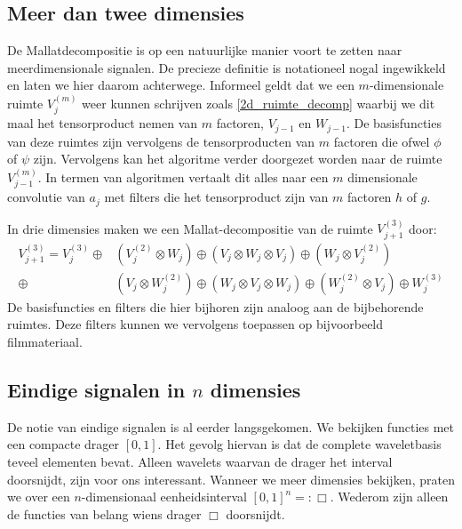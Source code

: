\subsection{Meer dan twee dimensies}
\label{mallat_md}
De Mallatdecompositie is op een natuurlijke manier voort te zetten naar meerdimensionale signalen.
De precieze definitie is notationeel nogal ingewikkeld en laten we hier daarom achterwege.
Informeel geldt dat we een $m$-dimensionale ruimte $V_{j}^{(m)}$ 
weer kunnen schrijven zoals \eqref{2d_ruimte_decomp}
waarbij we dit maal het tensorproduct nemen van $m$ factoren, $V_{j-1}$ en $W_{j-1}$.
De basisfuncties van deze ruimtes zijn vervolgens de tensorproducten van $m$ 
factoren die ofwel $\phi$ of $\psi$ zijn.
Vervolgens kan het algoritme verder doorgezet worden naar de ruimte $V_{j-1}^{(m)}$.
In termen van algoritmen vertaalt dit alles naar een $m$ dimensionale convolutie van $a_j$ met 
filters die het tensorproduct zijn van $m$ factoren $h$ of $g$.
\begin{voorbeeld}
  In drie dimensies maken we een Mallat-decompositie van de ruimte $V_{j+1}^{(3)}$ door:
  \[
  \begin{split}
    V_{j+1}^{(3)} = V_{j}^{(3)} \oplus& \left (V_j^{(2)} \otimes W_j \right) 
                              \oplus \left (V_j\otimes W_j \otimes V_j \right) 
                              \oplus \left (W_j\otimes V_j^{(2)} \right)\\ 
                              \oplus& \left (V_j\otimes W_j^{(2)} \right)  
                              \oplus \left (W_j\otimes V_j \otimes W_j \right) 
                              \oplus \left (W_j^{(2)} \otimes V_j \right) 
                              \oplus W_j^{(3)}
  \end{split}
  \]
  De basisfuncties en filters die hier bijhoren zijn analoog aan de bijbehorende ruimtes.
  Deze filters kunnen we vervolgens toepassen op bijvoorbeeld filmmateriaal.
\end{voorbeeld}

\subsection{Eindige signalen in $n$ dimensies}
De notie van eindige signalen is al eerder langsgekomen. We bekijken functies met een compacte drager $[0,1]$. 
Het gevolg hiervan is dat de complete waveletbasis teveel elementen bevat. 
Alleen wavelets waarvan de drager het interval doorsnijdt, zijn voor ons interessant. 
Wanneer we meer dimensies bekijken, praten we over een $n$-dimensionaal eenheidsinterval $[0,1]^n =: \Box$. 
Wederom zijn alleen de functies van belang wiens drager $\Box$ doorsnijdt.

